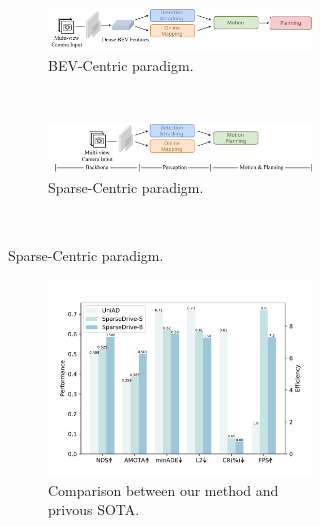 \begin{figure}[tb]
  \centering
  \begin{subfigure}{0.6\linewidth}
  \begin{subfigure}{1\linewidth}
    \includegraphics[width=1\linewidth]{Figures/pipeline_bev.pdf}
    \caption{BEV-Centric paradigm.}
    \label{fig:pipeline_bev}
  \end{subfigure}
  \hfill
  \\
  \begin{subfigure}{1\linewidth}
    \includegraphics[width=1\linewidth]{Figures/pipeline_sparse.pdf}
    \caption{Sparse-Centric paradigm.}
    \label{fig:pipeline_sparse}
  \end{subfigure}
  \label{fig:short}
  \\
  \hfill
  \end{subfigure}
  \hspace{2pt}
  \begin{subfigure}{0.38\linewidth}
  \centering
    \begin{subfigure}{1\linewidth}
    \includegraphics[width=1\linewidth]{Figures/comp.pdf}
    \caption{Comparison between our method and privous SOTA\cite{uniad}.}
    \label{fig:comp}
    \end{subfigure}
    \\
    \begin{subfigure}{1\linewidth}
    \end{subfigure}
    \\
    \begin{subfigure}{1\linewidth}
    \end{subfigure}


\end{subfigure}
\end{figure}
